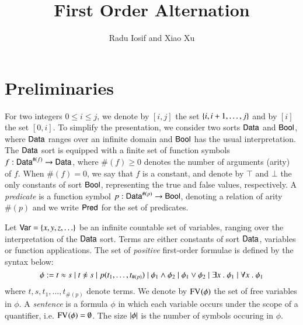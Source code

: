 \documentclass{llncs}
\begin{document}

\title{First Order Alternation}

\author{Radu Iosif and Xiao Xu}

\maketitle

\begin{abstract}
\end{abstract}

\section{Preliminaries}

For two integers $0 \leq i \leq j$, we denote by $[i,j]$ the set
$\{ i,i+1,\ldots,j \}$ and by $[i]$ the set $[0,i]$. To simplify the
presentation, we consider two sorts $\mathsf{Data}$ and $\mathsf{Bool}$, where $\mathsf{Data}$
ranges over an infinite domain and $\mathsf{Bool}$ has the usual
interpretation. The $\mathsf{Data}$ sort is equipped with a finite set of
function symbols $f : \mathsf{Data}^{\#(f)} \rightarrow \mathsf{Data}$, where
$\#(f)\geq0$ denotes the number of arguments (arity) of $f$. When
$\#(f)=0$, we say that $f$ is a constant, and denote by $\top$ and
$\bot$ the only constants of sort $\mathsf{Bool}$, representing the true and
false values, respectively. A \emph{predicate} is a function symbol
$p : \mathsf{Data}^{\#(p)} \rightarrow \mathsf{Bool}$, denoting a relation of arity
$\#(p)$ and we write $\mathsf{Pred}$ for the set of predicates.

Let $\mathsf{Var} = \{ x,y,z,\ldots \}$ be an infinite countable set of
variables, ranging over the interpretation of the $\mathsf{Data}$ sort. Terms
are either constants of sort $\mathsf{Data}$, variables or function
applications. The set of \emph{positive} first-order formulae is
defined by the syntax below:
\[\phi := t \teq s \mid t \not\teq s \mid p(t_1,\ldots,t_{\#(p)}) 
\mid \phi_1 \wedge \phi_2 \mid \phi_1 \vee \phi_2 \mid \exists x ~.~
\phi_1 \mid \forall x ~.~ \phi_1\] where $t,s,t_1,\ldots,t_{\#(p)}$
denote terms. We denote by $\mathrm{FV}_{}(\phi)$ the set of free variables in
$\phi$. A \emph{sentence} is a formula $\phi$ in which each variable
occurs under the scope of a quantifier, i.e. $\mathrm{FV}_{}(\phi) =
\emptyset$. The size ${|{\phi}|}$ is the number of symbols occuring in
$\phi$. 
\end{document}
